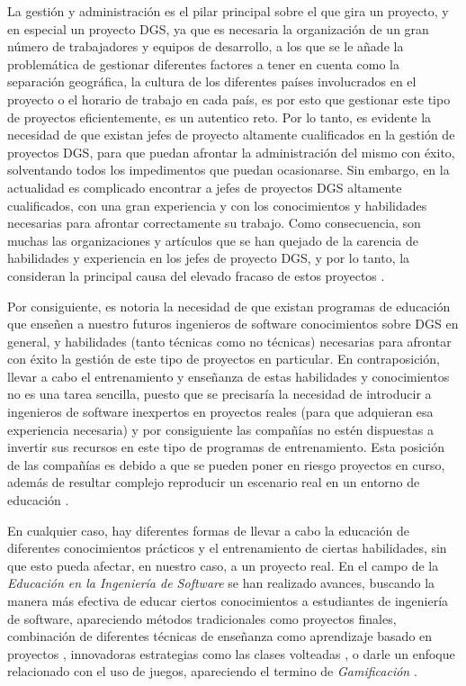 La gestión y administración es el pilar principal sobre el que gira un proyecto, y en especial un proyecto DGS, ya que es necesaria la organización de un gran número de trabajadores y equipos de desarrollo, a los que se le añade la problemática de gestionar diferentes factores a tener en cuenta como la separación geográfica, la cultura de los diferentes países involucrados en el proyecto o el horario de trabajo en cada país, es por esto que gestionar este tipo de proyectos eficientemente, es un autentico reto. Por lo tanto, es evidente la necesidad de que existan jefes de proyecto altamente cualificados en la gestión de proyectos DGS, para que puedan afrontar la administración del mismo con éxito, solventando todos los impedimentos que puedan ocasionarse. Sin embargo, en la actualidad es complicado encontrar a jefes de proyectos DGS altamente cualificados, con una gran experiencia y con los conocimientos y habilidades necesarias para afrontar correctamente su trabajo. Como consecuencia, son muchas las organizaciones y artículos que se han quejado de la carencia de habilidades y experiencia en los jefes de proyecto DGS, y por lo tanto, la consideran la principal  causa del elevado fracaso de estos proyectos \cite{lino2015project}.

Por consiguiente, es notoria la necesidad de que existan programas de educación que enseñen a nuestro futuros ingenieros de software conocimientos sobre DGS en general, y habilidades (tanto técnicas como no técnicas) necesarias para afrontar con éxito la gestión de este tipo de proyectos en particular. En contraposición, llevar a cabo el entrenamiento y enseñanza de estas habilidades y conocimientos no es una tarea sencilla, puesto que se precisaría la necesidad de introducir a ingenieros de software inexpertos en proyectos reales (para que adquieran esa experiencia necesaria) y por consiguiente las compañías no estén dispuestas a invertir sus recursos en este tipo de programas de entrenamiento. Esta posición de las compañías es debido a que se pueden poner en riesgo proyectos en curso, además de resultar complejo reproducir un escenario real en un entorno de educación \cite{monasor2010preparing}.

En cualquier caso, hay diferentes formas de llevar a cabo la educación de diferentes conocimientos prácticos y el entrenamiento de ciertas habilidades, sin que esto pueda afectar, en nuestro caso, a un proyecto real. En el campo de la \emph{Educación en la Ingeniería de Software} se han realizado avances, buscando la manera más efectiva de educar ciertos conocimientos a estudiantes de ingeniería de software, apareciendo métodos tradicionales como proyectos finales, combinación de diferentes técnicas de enseñanza como aprendizaje basado en proyectos \cite{alabbadi2016proposed}, innovadoras estrategias como las clases volteadas \cite{choi2013applying}, o darle un enfoque relacionado con el uso de juegos, apareciendo el termino de \emph{Gamificación} \cite{connolly2007application}.

